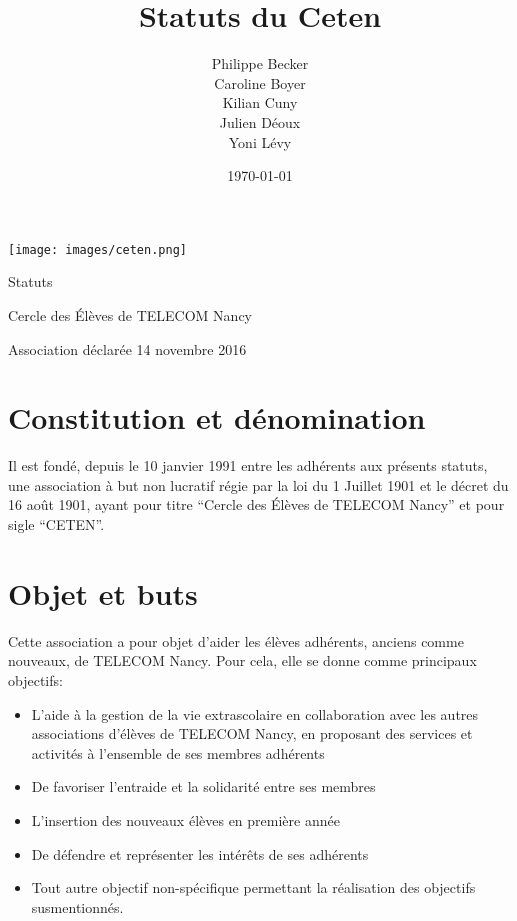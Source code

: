 \documentclass{article}
\title{Statuts du Ceten}
\author{Philippe Becker\\
	Caroline Boyer\\
	Kilian Cuny\\
	Julien Déoux\\
	Yoni Lévy} %
\date\today
\begin{document}

	
	\begin{titlepage}
		\begin{center}
			\texttt{[image: images/ceten.png]}\par
			\vspace{3cm}
			{\Huge\light{} Statuts}\par
			\vfill
			{\large Cercle des Élèves de TELECOM Nancy}\par
			{\large\light{} Association déclarée}
			\vfill
			{\light{} 14 novembre 2016}\par
		\end{center}
	\end{titlepage}



	\section{Constitution et dénomination}
\label{sec:consitution_et_denomination}
		Il est fondé, depuis le 10 janvier 1991 entre les adhérents aux présents
		statuts, une association à but non lucratif régie par la loi du 1
		Juillet 1901 et le décret du 16 août 1901, ayant pour titre “Cercle des
		Élèves de TELECOM Nancy” et pour sigle “CETEN”.

	\section{Objet et buts}
\label{sec:objet_et_buts}
		Cette association a pour objet d’aider les élèves adhérents, anciens
		comme nouveaux, de TELECOM Nancy. Pour cela, elle se donne comme
		principaux objectifs:
		\begin{itemize}
			\item L’aide à la gestion de la vie extrascolaire en collaboration
				avec les autres associations d'élèves de TELECOM Nancy, en
				proposant des services et activités à l’ensemble de ses membres
				adhérents
			\item De favoriser l’entraide et la solidarité entre ses membres
			\item L’insertion des nouveaux élèves en première année
			\item De défendre et représenter les intérêts de ses adhérents
			\item Tout autre objectif non-spécifique permettant la réalisation
				des objectifs susmentionnés.
		\end{itemize}
\end{document}
